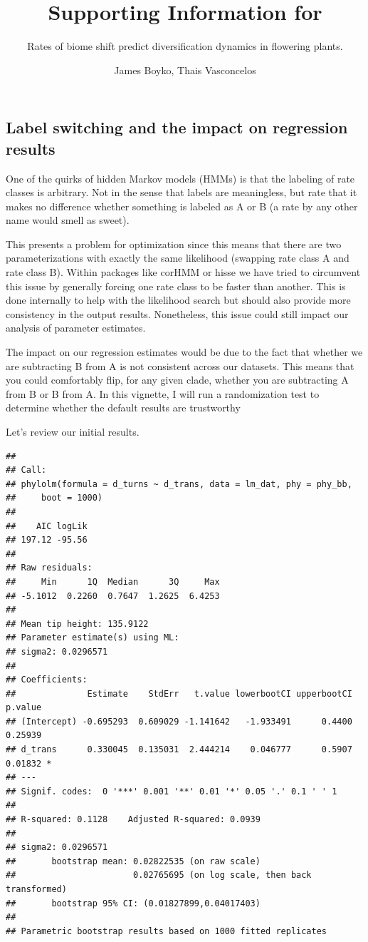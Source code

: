 \documentclass[
]{article}
\title{Supporting Information for}
\subtitle{Rates of biome shift predict diversification dynamics in
flowering plants.}
\author{James Boyko, Thais Vasconcelos}
\date{}
\begin{document}
\maketitle

\hypertarget{label-switching-and-the-impact-on-regression-results}{%
\subsection{Label switching and the impact on regression
results}\label{label-switching-and-the-impact-on-regression-results}}

One of the quirks of hidden Markov models (HMMs) is that the labeling of
rate classes is arbitrary. Not in the sense that labels are meaningless,
but rate that it makes no difference whether something is labeled as A
or B (a rate by any other name would smell as sweet).

This presents a problem for optimization since this means that there are
two parameterizations with exactly the same likelihood (swapping rate
class A and rate class B). Within packages like corHMM or hisse we have
tried to circumvent this issue by generally forcing one rate class to be
faster than another. This is done internally to help with the likelihood
search but should also provide more consistency in the output results.
Nonetheless, this issue could still impact our analysis of parameter
estimates.

The impact on our regression estimates would be due to the fact that
whether we are subtracting B from A is not consistent across our
datasets. This means that you could comfortably flip, for any given
clade, whether you are subtracting A from B or B from A. In this
vignette, I will run a randomization test to determine whether the
default results are trustworthy

Let's review our initial results.

\begin{verbatim}
## 
## Call:
## phylolm(formula = d_turns ~ d_trans, data = lm_dat, phy = phy_bb, 
##     boot = 1000)
## 
##    AIC logLik 
## 197.12 -95.56 
## 
## Raw residuals:
##     Min      1Q  Median      3Q     Max 
## -5.1012  0.2260  0.7647  1.2625  6.4253 
## 
## Mean tip height: 135.9122
## Parameter estimate(s) using ML:
## sigma2: 0.0296571 
## 
## Coefficients:
##              Estimate    StdErr   t.value lowerbootCI upperbootCI p.value  
## (Intercept) -0.695293  0.609029 -1.141642   -1.933491      0.4400 0.25939  
## d_trans      0.330045  0.135031  2.444214    0.046777      0.5907 0.01832 *
## ---
## Signif. codes:  0 '***' 0.001 '**' 0.01 '*' 0.05 '.' 0.1 ' ' 1
## 
## R-squared: 0.1128    Adjusted R-squared: 0.0939 
## 
## sigma2: 0.0296571
##       bootstrap mean: 0.02822535 (on raw scale)
##                       0.02765695 (on log scale, then back transformed)
##       bootstrap 95% CI: (0.01827899,0.04017403)
## 
## Parametric bootstrap results based on 1000 fitted replicates
\end{verbatim}
\end{document}
